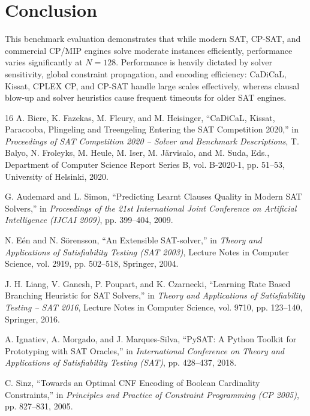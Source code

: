 \documentclass[a4paper,fleqn]{cas-sc}
\begin{document}
\section{Conclusion}
This benchmark evaluation demonstrates that while modern SAT, CP-SAT, and commercial CP/MIP engines solve moderate instances efficiently, performance varies significantly at $N = 128$. Performance is heavily dictated by solver sensitivity, global constraint propagation, and encoding efficiency: CaDiCaL, Kissat, CPLEX CP, and CP-SAT handle large scales effectively, whereas clausal blow-up and solver heuristics cause frequent timeouts for older SAT engines.

\begin{thebibliography}{16}
A. Biere, K. Fazekas, M. Fleury, and M. Heisinger, ``CaDiCaL, Kissat, Paracooba, Plingeling and Treengeling Entering the SAT Competition 2020,'' in \emph{Proceedings of SAT Competition 2020 -- Solver and Benchmark Descriptions}, T. Balyo, N. Froleyks, M. Heule, M. Iser, M. J\"arvisalo, and M. Suda, Eds., Department of Computer Science Report Series B, vol. B-2020-1, pp. 51--53, University of Helsinki, 2020.

G. Audemard and L. Simon, ``Predicting Learnt Clauses Quality in Modern SAT Solvers,'' in \emph{Proceedings of the 21st International Joint Conference on Artificial Intelligence (IJCAI 2009)}, pp. 399--404, 2009.

N. E\'en and N. S\"orensson, ``An Extensible SAT-solver,'' in \emph{Theory and Applications of Satisfiability Testing (SAT 2003)}, Lecture Notes in Computer Science, vol. 2919, pp. 502--518, Springer, 2004.

J. H. Liang, V. Ganesh, P. Poupart, and K. Czarnecki, ``Learning Rate Based Branching Heuristic for SAT Solvers,'' in \emph{Theory and Applications of Satisfiability Testing -- SAT 2016}, Lecture Notes in Computer Science, vol. 9710, pp. 123--140, Springer, 2016.

A. Ignatiev, A. Morgado, and J. Marques-Silva, ``PySAT: A Python Toolkit for Prototyping with SAT Oracles,'' in \emph{International Conference on Theory and Applications of Satisfiability Testing (SAT)}, pp. 428--437, 2018.

C. Sinz, ``Towards an Optimal CNF Encoding of Boolean Cardinality Constraints,'' in \emph{Principles and Practice of Constraint Programming (CP 2005)}, pp. 827--831, 2005.


\end{thebibliography}
\end{document}
